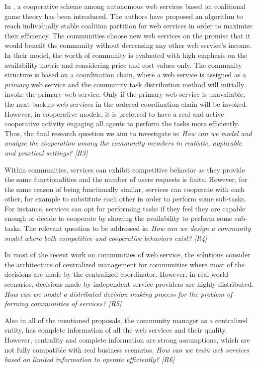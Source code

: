 In \cite{10.1109/TSC.2012.12}, a cooperative scheme among
autonomous web services based on coalitional game theory has been
introduced. The authors have proposed an algorithm to reach
individually stable coalition partition for web services in order
to maximize their efficiency. The communities choose new web
services on the promise that it would benefit the community
without decreasing any other web service's income. In their model,
the worth of community is evaluated with high emphasis on the
availability metric and considering price and cost values only.
The community structure is based on a coordination chain, where a
web service is assigned as a \emph{primary} web service and the
community task distribution method will initially invoke the
primary web service. Only if the primary web service is
unavailable, the next backup web services in the ordered
coordination chain will be invoked. However, in cooperative
models, it is preferred to have a real and active cooperative
activity engaging all agents to perform the tasks more
efficiently. Thus, the final research question we aim to investigate is: \emph{How can we model and analyze the cooperation
among the community members in realistic, applicable and practical
settings? [R3]}

Within communities, services can exhibit competitive behavior as they provide the same functionalities and the number of users requests is finite.
However, for the same reason of being functionally similar, services can cooperate with each other, for example to substitute each other in order to perform some sub-tasks.
For instance, services can opt for performing tasks if they feel they are capable enough
or decide to cooperate by showing the availability to perform some sub-tasks. The relevant question to be addressed is: \emph{How can we design a community model where both competitive and cooperative behaviors exist? [R4]}

In most of the recent work on communities of web service, the solutions consider the architecture of centralized management for communities where most of the decisions are made by the centralized coordinator. However, in real world scenarios, decisions made by independent service providers are highly distributed.  \emph{How can we model a distributed decision making process for the problem of forming communities of services? [R5]}

Also in all of the mentioned proposals, the community manager as a centralized entity, has complete information of all the web services and their quality. However, centrality and complete information are strong assumptions, which are not fully compatible with real business scenarios.
\emph{How can we train web services based on limited information to operate efficiently? [R6]}

